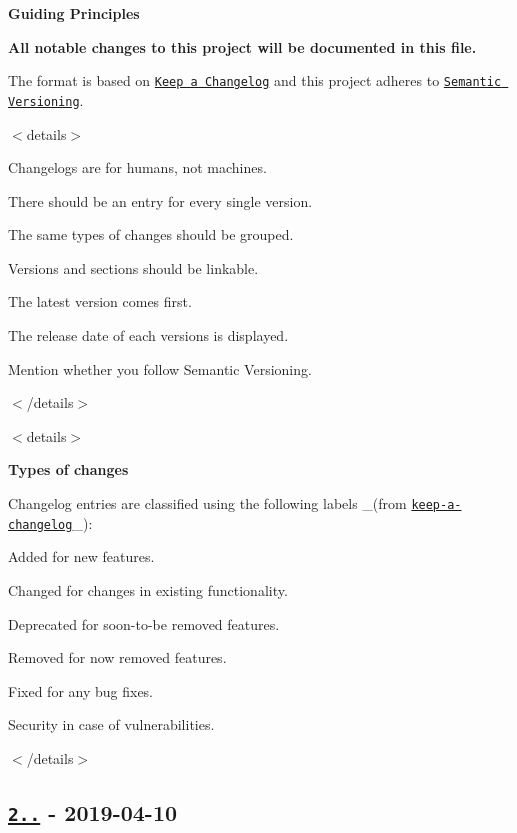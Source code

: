 {\bfseries Guiding Principles}

{\bfseries All notable changes to this project will be documented in this file.}

The format is based on \href{http://keepachangelog.com/en/1.0.0/}{\tt Keep a Changelog} and this project adheres to \href{http://semver.org/spec/v2.0.0.html}{\tt Semantic Versioning}.

$<$details$>$


\begin{DoxyItemize}
\item Changelogs are for humans, not machines.
\item There should be an entry for every single version.
\item The same types of changes should be grouped.
\item Versions and sections should be linkable.
\item The latest version comes first.
\item The release date of each versions is displayed.
\item Mention whether you follow Semantic Versioning.
\end{DoxyItemize}

$<$/details$>$

$<$details$>$ 

{\bfseries Types of changes}

Changelog entries are classified using the following labels \+\_\+(from \href{http://keepachangelog.com/}{\tt keep-\/a-\/changelog}\+\_\+)\+:


\begin{DoxyItemize}
\item {\ttfamily Added} for new features.
\item {\ttfamily Changed} for changes in existing functionality.
\item {\ttfamily Deprecated} for soon-\/to-\/be removed features.
\item {\ttfamily Removed} for now removed features.
\item {\ttfamily Fixed} for any bug fixes.
\item {\ttfamily Security} in case of vulnerabilities.
\end{DoxyItemize}

$<$/details$>$

\subsection*{\href{https://github.com/jonschlinkert/micromatch/compare/2.0.0...2.0.4}{\tt 2..} -\/ 2019-\/04-\/10}


